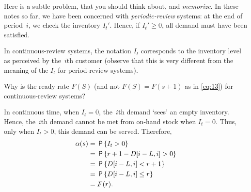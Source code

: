 \documentclass[queueing-book.tex]{subfiles}
\begin{document}
\begin{exercise}
Here is a subtle problem, that you should think about, and \emph{memorize}.
In these notes so far, we have been concerned with \emph{periodic-review} systems: at the end of period~$i$, we check the inventory $I_t'$.
Hence, if $I_t'\geq 0$, all demand must have been satisfied.

  In continuous-review systems,  the notation $I_t$ corresponds to the inventory level as perceived by the~$i$th customer (observe that this is very different from the meaning of the $I_t$ for period-review systems).

  Why is the ready rate $F(S)$ (and not $F(S)=F(s+1)$ as in \cref{eq:13}) for continuous-review systems?
  \begin{solution}
    In continuous time, when $I_t=0$, the~$i$th demand `sees' an empty inventory. Hence, the~$i$th demand cannot be met from on-hand stock when $I_t=0$. Thus, only when $I_t>0$, this demand can be served. Therefore,
\begin{align*}
   \alpha(s) &= \,\mathsf{P}\left\{I_t > 0\right\} \\
   &= \,\mathsf{P}\left\{r+1 - D[i-L, i] > 0\right\} \\
   &= \,\mathsf{P}\left\{D[i-L, i] <  r+1\right\} \\
   &= \,\mathsf{P}\left\{D[i-L, i] \leq  r\right\} \\
   & = F(r).
\end{align*}
  \end{solution}
\end{exercise}


\end{document}
